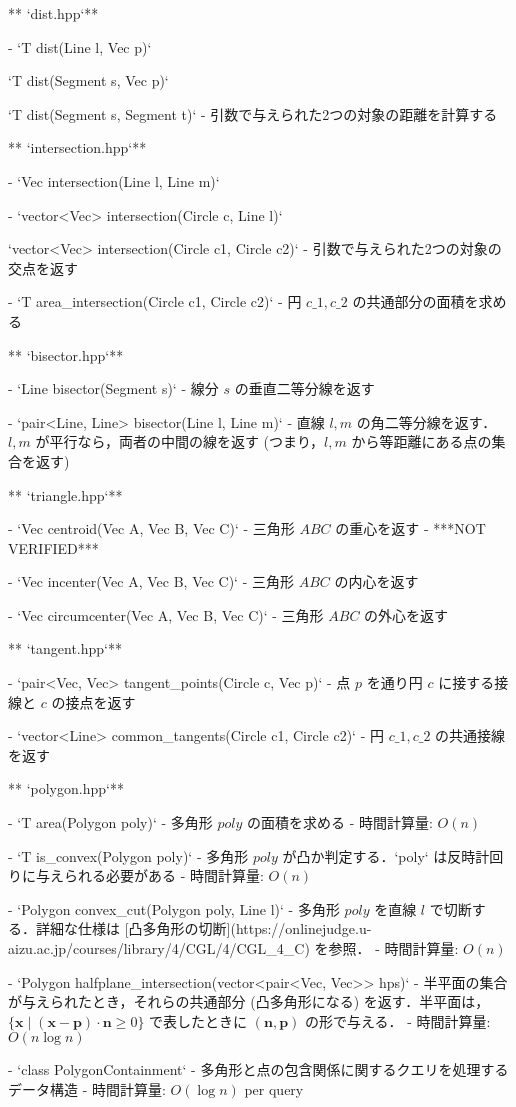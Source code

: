 \begin{small}
\begin{markdown}
** `dist.hpp`**

 - `T dist(Line l, Vec p)`

   `T dist(Segment s, Vec p)`

   `T dist(Segment s, Segment t)`
    - 引数で与えられた2つの対象の距離を計算する

** `intersection.hpp`**

- `Vec intersection(Line l, Line m)`

- `vector<Vec> intersection(Circle c, Line l)`

  `vector<Vec> intersection(Circle c1, Circle c2)`
    - 引数で与えられた2つの対象の交点を返す

- `T area\_intersection(Circle c1, Circle c2)`
    - 円 $c\_1,c\_2$ の共通部分の面積を求める

** `bisector.hpp`**

- `Line bisector(Segment s)`
    - 線分 $s$ の垂直二等分線を返す

- `pair<Line, Line> bisector(Line l, Line m)`
    - 直線 $l,m$ の角二等分線を返す．$l,m$ が平行なら，両者の中間の線を返す (つまり，$l,m$ から等距離にある点の集合を返す)

** `triangle.hpp`**

- `Vec centroid(Vec A, Vec B, Vec C)`
    - 三角形 $ABC$ の重心を返す
    - ***NOT VERIFIED***

- `Vec incenter(Vec A, Vec B, Vec C)`
    - 三角形 $ABC$ の内心を返す

- `Vec circumcenter(Vec A, Vec B, Vec C)`
    - 三角形 $ABC$ の外心を返す

** `tangent.hpp`**

- `pair<Vec, Vec> tangent\_points(Circle c, Vec p)`
    - 点 $p$ を通り円 $c$ に接する接線と $c$ の接点を返す

- `vector<Line> common\_tangents(Circle c1, Circle c2)`
    - 円 $c\_1,c\_2$ の共通接線を返す

** `polygon.hpp`**

- `T area(Polygon poly)`
    - 多角形 $poly$ の面積を求める
    - 時間計算量: $O(n)$

- `T is\_convex(Polygon poly)`
    - 多角形 $poly$ が凸か判定する．`poly` は反時計回りに与えられる必要がある
    - 時間計算量: $O(n)$

- `Polygon convex\_cut(Polygon poly, Line l)`
    - 多角形 $poly$ を直線 $l$ で切断する．詳細な仕様は [凸多角形の切断](https://onlinejudge.u-aizu.ac.jp/courses/library/4/CGL/4/CGL\_4\_C) を参照．
    - 時間計算量: $O(n)$

- `Polygon halfplane\_intersection(vector<pair<Vec, Vec>> hps)`
    - 半平面の集合が与えられたとき，それらの共通部分 (凸多角形になる) を返す．半平面は， $\{\boldsymbol{x}\mid(\boldsymbol{x}-\boldsymbol{p})\cdot \boldsymbol{n}\geq 0\}$ で表したときに $(\boldsymbol{n},\boldsymbol{p})$ の形で与える．
    - 時間計算量: $O(n\log n)$

- `class PolygonContainment`
    - 多角形と点の包含関係に関するクエリを処理するデータ構造
    - 時間計算量: $O(\log n)$ per query

\end{markdown}
\end{small}

